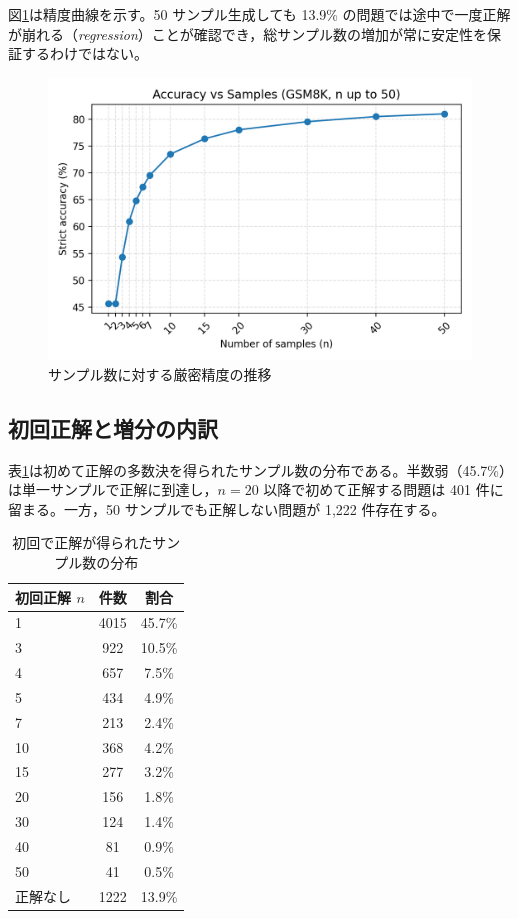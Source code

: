 \documentclass{ipsj}
\begin{document}
図\ref{fig:accuracy}は精度曲線を示す。50 サンプル生成しても 13.9\% の問題では途中で一度正解が崩れる（\textit{regression}）ことが確認でき，総サンプル数の増加が常に安定性を保証するわけではない。

\begin{figure}[tb]
  \centering
  \includegraphics[width=0.8\linewidth]{../../figures/n50_batch/accuracy_vs_n50.png}
  \caption{サンプル数に対する厳密精度の推移}
  \label{fig:accuracy}
\end{figure}

\subsection{初回正解と増分の内訳}
表\ref{tab:first}は初めて正解の多数決を得られたサンプル数の分布である。半数弱（45.7\%）は単一サンプルで正解に到達し，$n=20$ 以降で初めて正解する問題は 401 件に留まる。一方，50 サンプルでも正解しない問題が 1,222 件存在する。

\begin{table}[tb]
  \caption{初回で正解が得られたサンプル数の分布}
  \label{tab:first}
  \centering
  \begin{tabular}{@{}lcc@{}}
    \toprule
    初回正解 $n$ & 件数 & 割合 \\
    \midrule
    1 & 4015 & 45.7\% \\
    3 & 922 & 10.5\% \\
    4 & 657 & 7.5\% \\
    5 & 434 & 4.9\% \\
    7 & 213 & 2.4\% \\
    10 & 368 & 4.2\% \\
    15 & 277 & 3.2\% \\
    20 & 156 & 1.8\% \\
    30 & 124 & 1.4\% \\
    40 & 81 & 0.9\% \\
    50 & 41 & 0.5\% \\
    正解なし & 1222 & 13.9\% \\
    \bottomrule
  \end{tabular}
\end{table}
\end{document}

